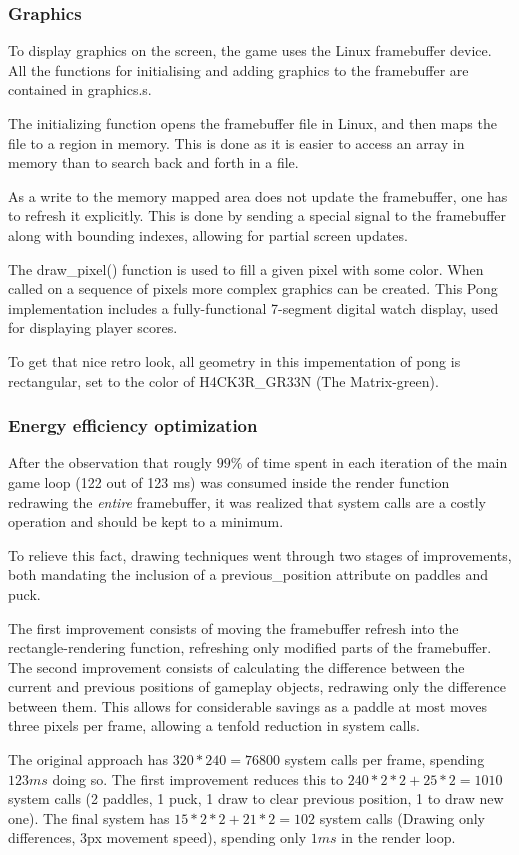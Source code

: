 \subsubsection{Graphics}
To display graphics on the screen, the game uses the Linux framebuffer device.
All the functions for initialising and adding graphics to the framebuffer are
contained in graphics.s.

The initializing function opens the framebuffer file in Linux, and then maps the
file to a region in memory. This is done as it is easier to access an array in memory
than to search back and forth in a file.

As a write to the memory mapped area does not update the framebuffer,
one has to refresh it explicitly.
This is done by sending a special signal to the framebuffer
along with bounding indexes, allowing for partial screen updates.

The draw\_pixel() function is used to fill a given pixel with some color.
When called on a sequence of pixels more complex graphics can be created.
This Pong implementation includes a fully-functional 7-segment digital watch display,
used for displaying player scores.

To get that nice retro look, all geometry in this impementation of pong is rectangular,
set to the color of H4CK3R\_GR33N (The Matrix-green).

\subsubsection{Energy efficiency optimization}
After the observation that rougly $ 99 \% $ of time spent in each iteration of the
main game loop (122 out of 123 ms) was consumed inside the render function redrawing
the \emph{entire} framebuffer,
it was realized that system calls are a costly operation and should be kept to a minimum.

To relieve this fact, drawing techniques went through two stages of improvements,
both mandating the inclusion of a previous\_position attribute on paddles and puck.

The first improvement consists of moving the framebuffer refresh into the
rectangle-rendering function, refreshing only modified parts of the framebuffer.
The second improvement consists of calculating the difference between the current
and previous positions of gameplay objects, redrawing only the difference between them.
This allows for considerable savings as a paddle at most moves three pixels per frame,
allowing a tenfold reduction in system calls.

The original approach has $ 320 * 240 = 76800 $
system calls per frame, spending $ 123 ms $ doing so.
The first improvement reduces this to $ 240 * 2 * 2+ 25 * 2 = 1010 $ system calls
(2 paddles, 1 puck, 1 draw to clear previous position, 1 to draw new one).
The final system has $ 15 * 2 * 2 + 21 * 2 = 102 $ system calls
(Drawing only differences, 3px movement speed), spending only $ 1 ms $ in the render loop.
